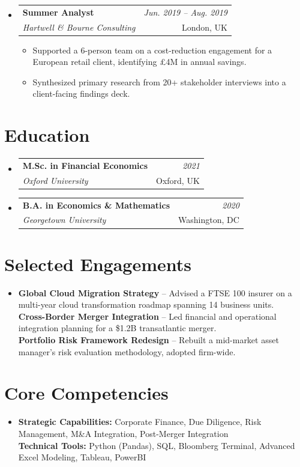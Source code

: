 \documentclass[10pt,letterpaper]{article}
\makeatletter
\newenvironment{entrylist}{\begin{itemize}[leftmargin=0in, label={}]}{\end{itemize}}
\newenvironment{bulletlist}{\begin{itemize}[leftmargin=0.15in, topsep=2pt, itemsep=2pt, parsep=0pt]}{\end{itemize}}
\newcommand{\entry}[4]{
  \vspace{4pt}\item
  \begin{tabular*}{1.0\textwidth}[t]{l@{\extracolsep{\fill}}r}
    \textbf{#1} & \textit{#2} \\
    \textit{#3} & {#4} \\
  \end{tabular*}\vspace{-4pt}
}
\makeatother
\begin{document}
\begin{entrylist}
    \entry{Summer Analyst}{Jun. 2019 -- Aug. 2019}{Hartwell \& Bourne Consulting}{London, UK}
    \begin{bulletlist}
        \item Supported a 6-person team on a cost-reduction engagement for a European retail client, identifying £4M in annual savings.
        \item Synthesized primary research from 20+ stakeholder interviews into a client-facing findings deck.
    \end{bulletlist}
\end{entrylist}

\section{Education}
\begin{entrylist}
    \entry{M.Sc. in Financial Economics}{2021}{Oxford University}{Oxford, UK}
    \entry{B.A. in Economics \& Mathematics}{2020}{Georgetown University}{Washington, DC}
\end{entrylist}

\section{Selected Engagements}
\begin{entrylist}
    \item \vspace{2pt}
    \textbf{Global Cloud Migration Strategy} -- Advised a FTSE 100 insurer on a multi-year cloud transformation roadmap spanning 14 business units. \\
    \textbf{Cross-Border Merger Integration} -- Led financial and operational integration planning for a \$1.2B transatlantic merger. \\
    \textbf{Portfolio Risk Framework Redesign} -- Rebuilt a mid-market asset manager's risk evaluation methodology, adopted firm-wide.
\end{entrylist}

\section{Core Competencies}
\begin{entrylist}
    \item \vspace{2pt}
    \textbf{Strategic Capabilities:} Corporate Finance, Due Diligence, Risk Management, M\&A Integration, Post-Merger Integration \\
    \textbf{Technical Tools:} Python (Pandas), SQL, Bloomberg Terminal, Advanced Excel Modeling, Tableau, PowerBI
\end{entrylist}
\end{document}
